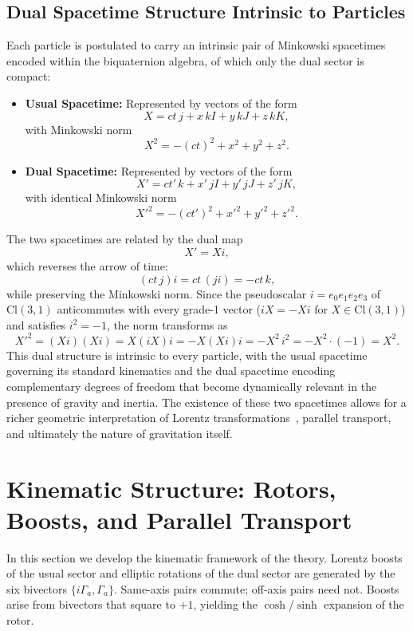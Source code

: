 \documentclass[a4paper]{article}
\begin{document}
\subsection{Dual Spacetime Structure Intrinsic to Particles}

Each particle is postulated to carry an intrinsic pair of Minkowski spacetimes encoded within the biquaternion algebra, of which only the dual sector is compact:
\begin{itemize}
  \item \textbf{Usual Spacetime:} Represented by vectors of the form
  \[
  X = ct \, j + x \, kI + y \, kJ + z \, kK,
  \]
  with Minkowski norm
  \[
  X^2 = -(ct)^2 + x^2 + y^2 + z^2.
  \]

  \item \textbf{Dual Spacetime:} Represented by vectors of the form
  \[
  X' = ct' \, k + x' \, jI + y' \, jJ + z' \, jK,
  \]
  with identical Minkowski norm
  \[
  X'^2 = -(ct')^2 + x'^2 + y'^2 + z'^2.
  \]
\end{itemize}
The two spacetimes are related by the dual map
\[
X' = X i,
\]
which reverses the arrow of time:
\[
(ct \, j) i = ct \, (j i) = -ct \, k,
\]
while preserving the Minkowski norm. Since the pseudoscalar $i = e_0 e_1 e_2 e_3$ of $\mathrm{Cl}(3,1)$ anticommutes with every grade-1 vector ($i X = -X i$ for $X \in \mathrm{Cl}(3,1)$) and satisfies $i^2 = -1$, the norm transforms as
\[
X'^2 = (X i)(X i) = X (i X) i = -X (X i) i = -X^2\, i^2 = -X^2 \cdot (-1) = X^2.
\]
This dual structure is intrinsic to every particle, with the usual spacetime governing its standard kinematics and the dual spacetime encoding complementary degrees of freedom that become dynamically relevant in the presence of gravity and inertia. The existence of these two spacetimes allows for a richer geometric interpretation of Lorentz transformations~\cite{lorentz1904}, parallel transport, and ultimately the nature of gravitation itself.

\section{Kinematic Structure: Rotors, Boosts, and Parallel Transport}
\label{sec:kinematics}

In this section we develop the kinematic framework of the theory. Lorentz boosts of the usual sector and elliptic rotations of the dual sector are generated by the six bivectors $\{i\Gamma_a,\Gamma_a\}$. Same-axis pairs commute; off-axis pairs need not. Boosts arise from bivectors that square to $+1$, yielding the $\cosh$/$\sinh$ expansion of the rotor.
\end{document}
